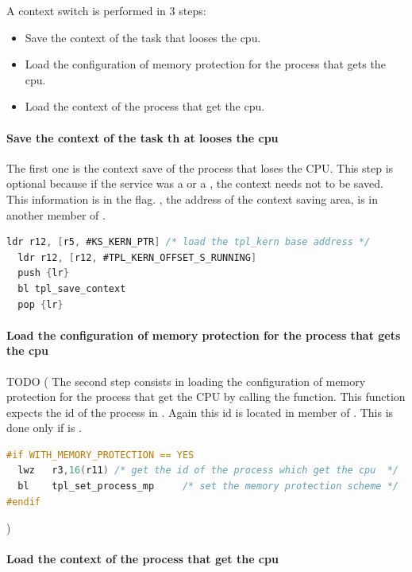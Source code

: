 A context switch is performed in 3 steps:
\begin{itemize}
\item Save the context of the task that looses the cpu.
\item Load the configuration of memory protection for the process that gets the cpu.
\item Load the context of the process that get the cpu.
\end{itemize}

\paragraph{Save the context of the task th	at looses the cpu}

The first one is the context save of the process that loses the CPU. This step is optional because if the service was a  or a , the context needs not to be saved. This information is in the  flag. , the address of the context saving area, is in another member of . 

\begin{lstlisting}[language=C]
  ldr r12, [r5, #KS_KERN_PTR] /* load the tpl_kern base address */
  ldr r12, [r12, #TPL_KERN_OFFSET_S_RUNNING]
  push {lr}
  bl tpl_save_context
  pop {lr}
\end{lstlisting}

\paragraph{Load the configuration of memory protection for the process that gets the cpu}

TODO
(
The second step consists in loading the configuration of memory protection for the process that get the CPU by calling the  function. This function expects the id of the process in . Again this id is located in member  of . This is done only if  is \YES. 

\begin{lstlisting}[language=C]
#if WITH_MEMORY_PROTECTION == YES
  lwz   r3,16(r11) /* get the id of the process which get the cpu  */
  bl    tpl_set_process_mp     /* set the memory protection scheme */
#endif
\end{lstlisting}
)

\paragraph{Load the context of the process that get the cpu}

